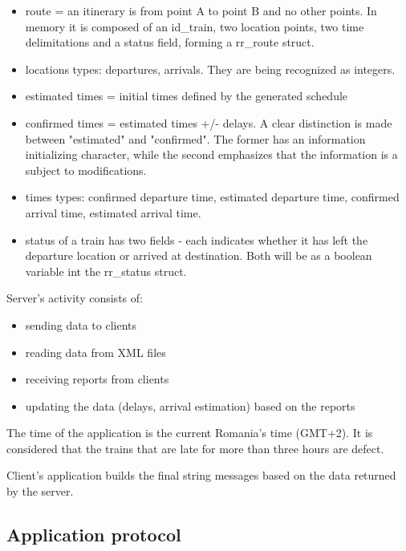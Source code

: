 \documentclass[runningheads]{llncs}
\begin{document}
\begin{itemize}
    \item route = an itinerary is from point A to point B and no other points. In memory it is composed of an id\_train, two location points, two time delimitations and a status field, forming a rr\_route struct.

    \item locations types: departures, arrivals. They are being recognized as integers.

    \item estimated times = initial times defined by the generated schedule
    \item confirmed times = estimated times +/- delays. A clear distinction is made between "estimated" and "confirmed". The former has an information initializing character, while the second emphasizes that the information is a subject to modifications.
    
    \item times types: confirmed departure time, estimated departure time, confirmed arrival time, estimated arrival time.
    
    \item status of a train has two fields - each indicates whether it has left the departure location or arrived at destination. Both will be as a boolean variable int the rr\_status struct.
\end{itemize}

Server's activity consists of:
\begin{itemize}
    \item sending data to clients
    \item reading data from XML files
    \item receiving reports from clients
    \item updating the data (delays, arrival estimation) based on the reports
\end{itemize}

The time of the application is the current Romania's time (GMT+2). It is considered that the trains that are late for more than three hours are defect.

Client's application builds the final string messages based on the data returned by the server. 


\subsection{Application protocol}
\end{document}
